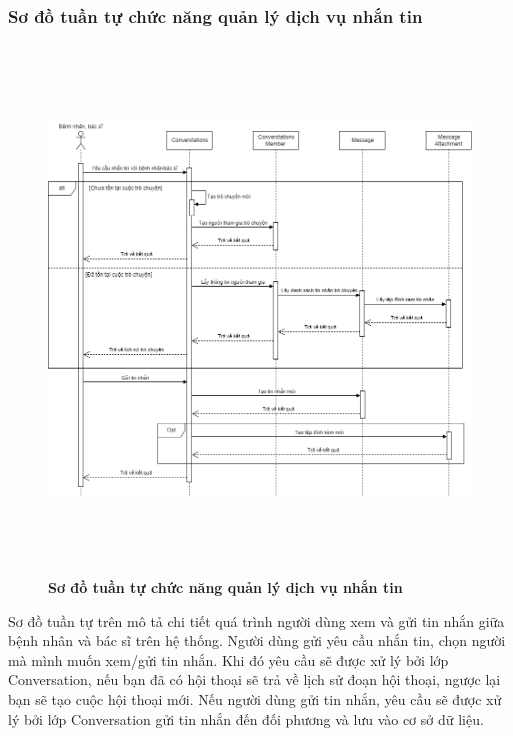 \subsubsection{Sơ đồ tuần tự chức năng quản lý dịch vụ nhắn tin}
\begin{figure}[H]
  \centering
  \includegraphics[width=15.5cm,height=14cm]{Images/sequence/sequence_chat.png}
  \caption[Sơ đồ tuần tự chức năng quản lý dịch vụ nhắn tin]{\bfseries \fontsize{12pt}{0pt}
  \selectfont Sơ đồ tuần tự chức năng quản lý dịch vụ nhắn tin}
  \label{sequence_chat} %
\end{figure}
Sơ đồ tuần tự trên mô tả chi tiết quá trình người dùng xem và gửi tin nhắn giữa bệnh nhân và bác sĩ trên hệ thống. Người dùng gửi yêu cầu nhắn tin, 
chọn người mà mình muốn xem/gửi tin nhắn. Khi đó yêu cầu sẽ được xử lý bởi lớp Conversation, nếu bạn đã có hội thoại sẽ trả về lịch sử đoạn hội thoại, ngược lại bạn sẽ tạo cuộc hội thoại mới. 
Nếu người dùng gửi tin nhắn, yêu cầu sẽ được xử lý bởi lớp Conversation gửi tin nhắn đến đối phương và lưu vào cơ sở dữ liệu.


